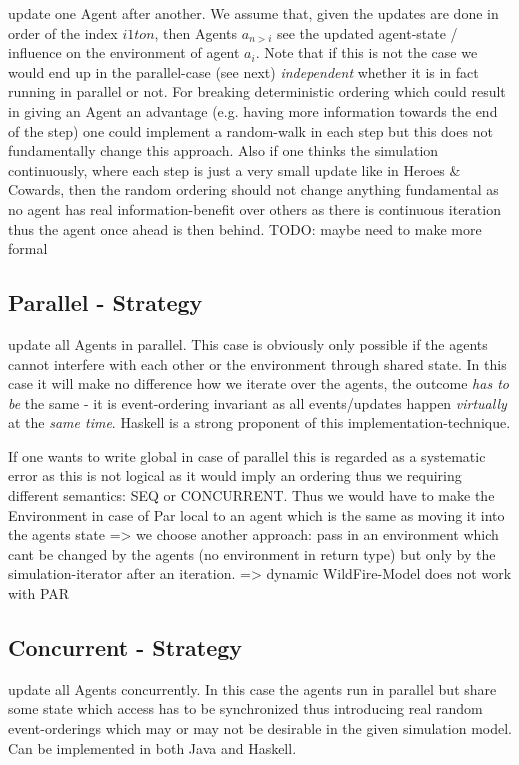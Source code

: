 update one Agent after another. We assume that, given the updates are done in order of the index $i 1 to n$, then Agents $a_{n>i}$ see the updated agent-state / influence on the environment of agent $a_i$. Note that if this is not the case we would end up in the parallel-case (see next) \textit{independent} whether it is in fact running in parallel or not. For breaking deterministic ordering which could result in giving an Agent an advantage (e.g. having more information towards the end of the step) one could implement a random-walk in each step but this does not fundamentally change this approach. Also if one thinks the simulation continuously, where each step is just a very small update like in Heroes \& Cowards, then the random ordering should not change anything fundamental as no agent has real information-benefit over others as there is continuous iteration thus the agent once ahead is then behind. TODO: maybe need to make more formal


\subsection{Parallel - Strategy}
update all Agents in parallel. This case is obviously only possible if the agents cannot interfere with each other or the environment through shared state. In this case it will make no difference how we iterate over the agents, the outcome \textit{has to be} the same - it is event-ordering invariant as all events/updates happen \textit{virtually} at the \textit{same time}. Haskell is a strong proponent of this implementation-technique.

If one wants to write global in case of parallel this is regarded as a systematic error as this is not logical as it would imply an ordering thus we requiring different semantics: SEQ or CONCURRENT. Thus we would have to make the Environment in case of Par local to an agent which is the same as moving it into the agents state => we choose another approach: pass in an environment which cant be changed by the agents (no environment in return type) but only by the simulation-iterator after an iteration.  => dynamic WildFire-Model does not work with PAR
		
		
\subsection{Concurrent - Strategy}
update all Agents concurrently. In this case the agents run in parallel but share some state which access has to be synchronized thus introducing real random event-orderings which may or may not be desirable in the given simulation model. Can be implemented in both Java and Haskell.


